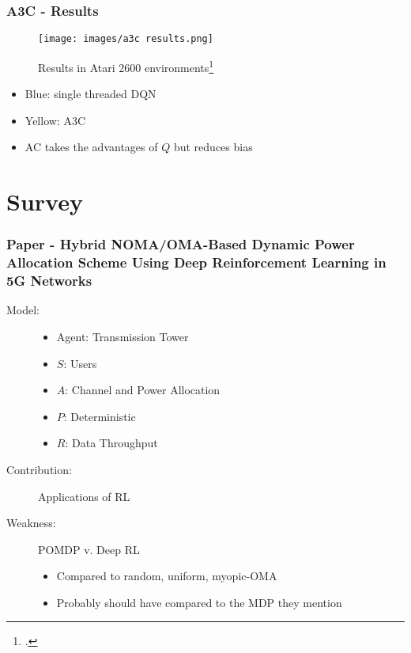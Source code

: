 \documentclass{beamer}
\begin{document}
\begin{frame}
    \frametitle{A3C - Results}
    \begin{figure}
        \texttt{[image: images/a3c results.png]}
        \caption{Results in Atari 2600 environments\footcite{mnih2016}}
    \end{figure}
    \begin{itemize}
        \item Blue: single threaded DQN
        \item Yellow: A3C
        \item AC takes the advantages of $Q$ but reduces bias
    \end{itemize}
\end{frame}

\section{Survey}

\begin{frame}
    \frametitle{Paper \thepapercounter - Hybrid NOMA/OMA-Based Dynamic Power Allocation Scheme Using 
        Deep Reinforcement Learning in 5G Networks}
    \begin{description}
        \item[Model:]
        \begin{itemize}
            \item Agent: Transmission Tower
            \item $S$: Users
            \item $A$: Channel and Power Allocation
            \item $P$: Deterministic
            \item $R$: Data Throughput
        \end{itemize}
        \item[Contribution:] Applications of RL
        \item[Weakness:] POMDP v. Deep RL 
        \begin{itemize}
            \item Compared to random, uniform, myopic-OMA
            \item Probably should have compared to the MDP they mention
        \end{itemize}
    \end{description}
\end{frame}
\end{document}
